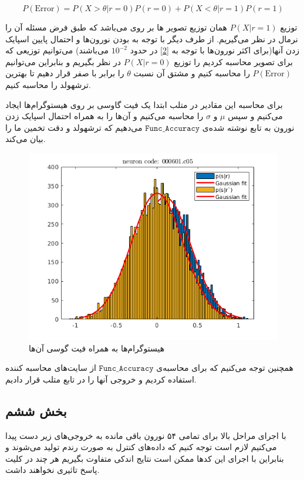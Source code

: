 \documentclass[12pt,onecolumn,a4paper,fleqn]{article}
\newcommand{\pf}[1]{$\mathtt{#1}$}
\begin{document}
$$ P(\text{Error}) = P(X > \theta | r = 0)P(r = 0) + P(X < \theta | r = 1)P(r = 1) $$

توزیع $P(X|r=1)$ همان توزیع تصویر  ها بر روی  می‌باشد که طبق فرض مسئله آن را نرمال در نظر می‌گیریم. از طرف دیگر با توجه به  بودن نورون‌ها و احتمال پایین اسپایک زدن آنها(برای اکثر نورون‌ها با توجه به \autoref{2} در حدود $10^{-2}$ می‌باشند) می‌توانیم توزیعی که برای تصویر  محاسبه کردیم را توزیع $P(X|r=0)$ در نظر بگیریم و بنابراین می‌توانیم $P(\text{Error})$ را محاسبه کنیم و مشتق آن نسبت $\theta$ را برابر با صفر قرار دهیم تا بهترین ترشهولد را محاسبه کنیم.

برای محاسبه این مقادیر در متلب ابتدا یک فیت گاوسی بر روی هیستوگرام‌ها ایجاد می‌کنیم و سپس $\mu$ و $\sigma$ را محاسبه می‌کنیم و آن‌ها را به همراه احتمال اسپایک زدن نورون به تابع نوشته شده‌ی
 \pf{Func\_Accuracy} می‌دهیم که ترشهولد و دقت تخمین ما را بیان می‌کند.

\begin{figure}[h]
	\centering
	\includegraphics[width=0.6\linewidth]{photos/sta-fit-gaussian.png}
	\caption{
هیستوگرام‌ها به همراه فیت گوسی آن‌ها
	}
	\label{1}
\end{figure}

همچنین توجه می‌کنیم که برای محاسبه‌ی 
\pf{Func\_Accuracy}
از سایت‌های محاسبه کننده استفاده کردیم و خروجی آنها را در تابع متلب قرار دادیم.
 
\pagebreak
		 
		 \subsection{بخش ششم}
		 با اجرای مراحل بالا برای تمامی ۵۴ نورون باقی مانده به خروجی‌های زیر دست پیدا می‌کنیم لازم است توجه کنیم که داده‌های کنترل به صورت رندم تولید می‌شوند و بنابراین با اجرای این کدها ممکن است نتایج اندکی متفاوت بگیریم هر چند در کلیت پاسخ تاثیری نخواهند داشت.
	
		 \setcounter{int}{1}
		 \loop
		 
\end{document}
